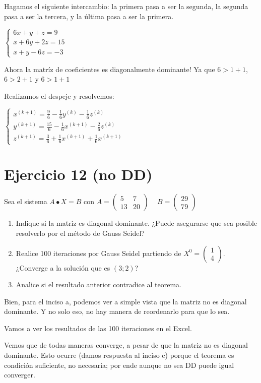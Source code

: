 \documentclass[11pt]{article}
\begin{document}
	Hagamos el siguiente intercambio: la primera pasa a ser la segunda, la segunda pasa a ser la tercera, y la última pasa a ser la primera.
	
	$
	\begin{cases}
		6x+y+z=9\\
		x+6y+2z=15\\
		x+y-6z=-3
	\end{cases}
	$
	
	Ahora la matríz de coeficientes es diagonalmente dominante! Ya que $\boxed{6>1+1}$, $\boxed{6>2+1}$ y $\boxed{6>1+1}$
	
	Realizamos el despeje y resolvemos:
	
	$\begin{cases}
		x^{(k+1)}=\frac{9}{6}-\frac{1}{6}y^{(k)}-\frac{1}{6}z^{(k)}\\
		y^{(k+1)}=\frac{15}{6}-\frac{1}{6}x^{(k+1)}-\frac{2}{6}z^{(k)}\\
		z^{(k+1)}=\frac{3}{6}+\frac{1}{6}x^{(k+1)}+\frac{1}{6}x^{(k+1)}
	\end{cases}$

	\section{Ejercicio 12 (no DD)}
	Sea el sistema $A\bullet X = B$ con $A=\begin{pmatrix}
		5 & 7\\
		13 & 20
	\end{pmatrix}\;\;\;$ $B=\begin{pmatrix}
	29\\
	79
\end{pmatrix}$

	\begin{enumerate}[label=\alph*)]
		\item Indique si la matriz es diagonal dominante. ¿Puede asegurarse que sea posible resolverlo por el método de Gauss Seidel?
		\item Realice 100 iteraciones por Gauss Seidel partiendo de $X^{0}=\begin{pmatrix}
			1\\4
		\end{pmatrix}$. ¿Converge a la solución que es $(3;2)$?
		\item Analice si el resultado anterior contradice al teorema.
	\end{enumerate}

	Bien, para el inciso a, podemos ver a simple vista que la matriz no es diagonal dominante. Y no solo eso, no hay manera de reordenarlo para que lo sea.
	
	Vamos a ver los resultados de las 100 iteraciones en el Excel.
	
	Vemos que de todas maneras converge, a pesar de que la matriz no es diagonal dominante. Esto ocurre (damos respuesta al inciso c) porque el teorema es condición suficiente, no necesaria; por ende aunque no sea DD puede igual converger.
\end{document}
